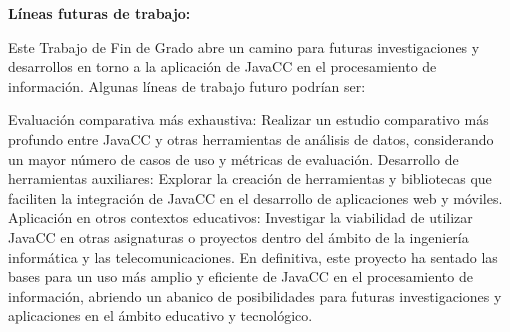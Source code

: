 \phantom{text}

\noindent \textbf{Líneas futuras de trabajo:}

\phantom{text}

Este Trabajo de Fin de Grado abre un camino para futuras investigaciones y desarrollos en torno a la aplicación de JavaCC en el procesamiento de información. Algunas líneas de trabajo futuro podrían ser:

Evaluación comparativa más exhaustiva: Realizar un estudio comparativo más profundo entre JavaCC y otras herramientas de análisis de datos, considerando un mayor número de casos de uso y métricas de evaluación.
Desarrollo de herramientas auxiliares: Explorar la creación de herramientas y bibliotecas que faciliten la integración de JavaCC en el desarrollo de aplicaciones web y móviles.
Aplicación en otros contextos educativos: Investigar la viabilidad de utilizar JavaCC en otras asignaturas o proyectos dentro del ámbito de la ingeniería informática y las telecomunicaciones.
En definitiva, este proyecto ha sentado las bases para un uso más amplio y eficiente de JavaCC en el procesamiento de información, abriendo un abanico de posibilidades para futuras investigaciones y aplicaciones en el ámbito educativo y tecnológico.